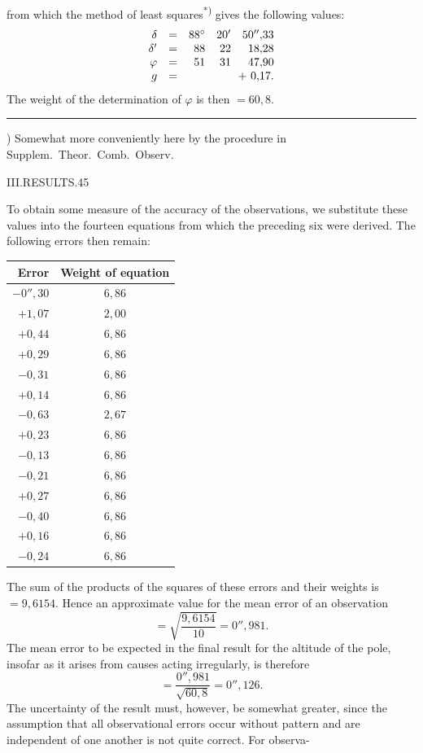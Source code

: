 from which the method of least squares\textsuperscript{*)} gives the following values:
\[
\begin{array}{rcrrr}
\delta&=&88^\circ&20'&50''{,}33\\
\delta'&=&88&22&18{,}28\\
\varphi&=&51&31&47{,}90\\
g&=&\multicolumn{3}{r}{+\ 0{,}17.}
\end{array}
\]
The weight of the determination of $\varphi$ is then $=60{,}8$.
\par\noindent\rule{.25\textwidth}{.4pt}\par
{\footnotesize *) Somewhat more conveniently here by the procedure in Supplem.\ Theor.\ Comb.\ Observ.\par}

\clearpage
\noindent\mbox{}\hfill III.\quad RESULTS.\hfill 45\par
To obtain some measure of the accuracy of the observations, we substitute these values into the fourteen equations from which the preceding six were derived. The following errors then remain:
\begin{center}
\begin{tabular}{r|c}
Error&Weight of equation\\\hline
$-0''{,}30$&$6{,}86$\\
$+1{,}07$&$2{,}00$\\
$+0{,}44$&$6{,}86$\\
$+0{,}29$&$6{,}86$\\
$-0{,}31$&$6{,}86$\\
$+0{,}14$&$6{,}86$\\
$-0{,}63$&$2{,}67$\\
$+0{,}23$&$6{,}86$\\
$-0{,}13$&$6{,}86$\\
$-0{,}21$&$6{,}86$\\
$+0{,}27$&$6{,}86$\\
$-0{,}40$&$6{,}86$\\
$+0{,}16$&$6{,}86$\\
$-0{,}24$&$6{,}86$
\end{tabular}
\end{center}
The sum of the products of the squares of these errors and their weights is $=9{,}6154$. Hence an approximate value for the mean error of an observation
\[
=\sqrt{\frac{9{,}6154}{10}}=0''{,}981.
\]
The mean error to be expected in the final result for the altitude of the pole, insofar as it arises from causes acting irregularly, is therefore
\[
=\frac{0''{,}981}{\sqrt{60{,}8}}=0''{,}126.
\]
The uncertainty of the result must, however, be somewhat greater, since the assumption that all observational errors occur without pattern and are independent of one another is not quite correct. For observa-

